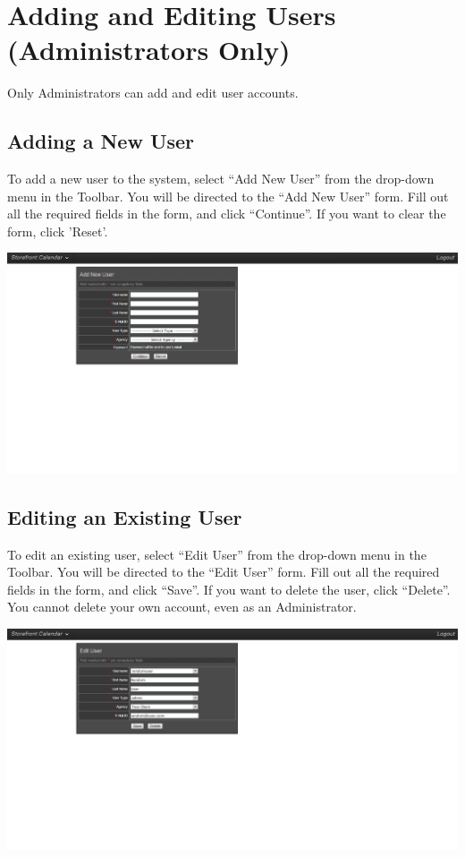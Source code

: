 \section{Adding and Editing Users (Administrators Only)}

Only Administrators can add and edit user accounts.


\subsection{Adding a New User}

To add a new user to the system, select ``Add New User'' from the drop-down menu in the Toolbar. You will be directed to the ``Add New User'' form. Fill out all the required fields in the form, and click ``Continue''. If you want to clear the form, click 'Reset'.

\includegraphics[width=\linewidth]{screenshots/img_adduser}


\newpage


\subsection{Editing an Existing User}

To edit an existing user, select ``Edit User'' from the drop-down menu in the Toolbar. You will be directed to the ``Edit User'' form. Fill out all the required fields in the form, and click ``Save''. If you want to delete the user, click ``Delete''. You cannot delete your own account, even as an Administrator.

\includegraphics[width=\linewidth]{screenshots/img_edituser}



